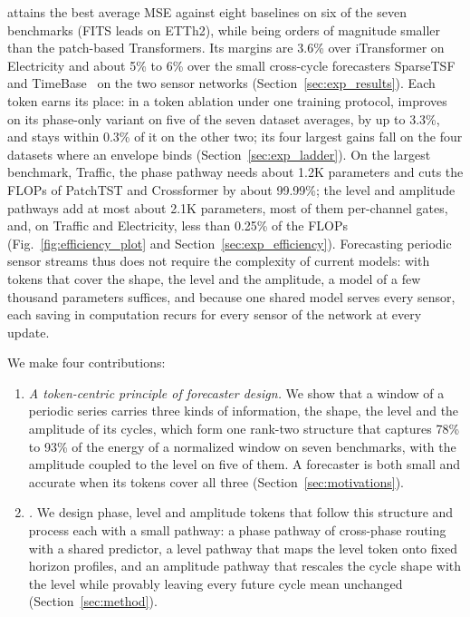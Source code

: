 {
\sysplus attains the best average MSE against eight baselines on six of the seven benchmarks (FITS leads on ETTh2), while being orders of magnitude smaller than the patch-based Transformers. Its margins are 3.6\% over iTransformer on Electricity and about 5\% to 6\% over the small cross-cycle forecasters SparseTSF~\citep{lin2024sparsetsf} and TimeBase~\citep{huang2025timebase} on the two sensor networks (Section~\ref{sec:exp_results}). Each token earns its place: in a token ablation under one training protocol, \sysplus improves on its phase-only variant on five of the seven dataset averages, by up to 3.3\%, and stays within 0.3\% of it on the other two; its four largest gains fall on the four datasets where an envelope binds (Section~\ref{sec:exp_ladder}). On the largest benchmark, Traffic, the phase pathway needs about 1.2K parameters and cuts the FLOPs of PatchTST and Crossformer by about 99.99\%; the level and amplitude pathways add at most about 2.1K parameters, most of them per-channel gates, and, on Traffic and Electricity, less than 0.25\% of the FLOPs (Fig.~\ref{fig:efficiency_plot} and Section~\ref{sec:exp_efficiency}). Forecasting periodic sensor streams thus does not require the complexity of current models: with tokens that cover the shape, the level and the amplitude, a model of a few thousand parameters suffices, and because one shared model serves every sensor, each saving in computation recurs for every sensor of the network at every update.

We make four contributions:
\begin{enumerate}[leftmargin=2em]
\item \emph{A token-centric principle of forecaster design.} We show that a window of a periodic series carries three kinds of information, the shape, the level and the amplitude of its cycles, which form one rank-two structure that captures 78\% to 93\% of the energy of a normalized window on seven benchmarks, with the amplitude coupled to the level on five of them. A forecaster is both small and accurate when its tokens cover all three (Section~\ref{sec:motivations}).

\item \emph{\sysplus.} We design phase, level and amplitude tokens that follow this structure and process each with a small pathway: a phase pathway of cross-phase routing with a shared predictor, a level pathway that maps the level token onto fixed horizon profiles, and an amplitude pathway that rescales the cycle shape with the level while provably leaving every future cycle mean unchanged (Section~\ref{sec:method}).


\end{enumerate}}
